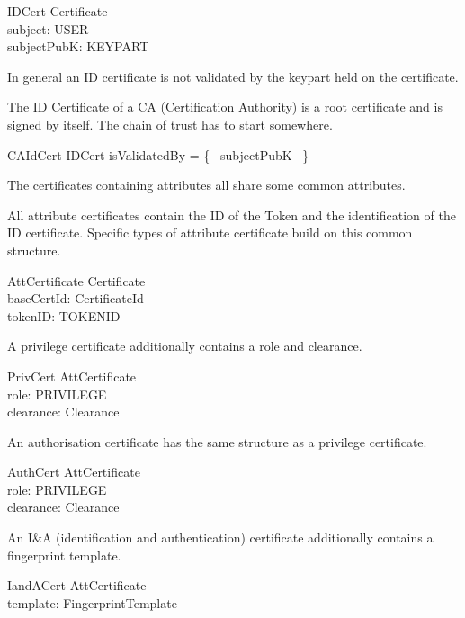 \begin{schema}{IDCert}
	Certificate
\\      subject: USER
\\      subjectPubK: KEYPART
\end{schema}

In general an ID certificate is not validated by the keypart held on
the certificate. 

The ID Certificate of a CA (Certification Authority) is a root
certificate and is signed by itself. The chain of trust has
to start somewhere.

\begin{schema}{CAIdCert}
        IDCert
\where
        isValidatedBy = \{~ subjectPubK ~\} 
\end{schema}


The certificates containing attributes all share some common
attributes. 

All attribute certificates contain the ID of 
the Token and the identification of the ID certificate. Specific types
of attribute certificate build on this common structure.
\begin{schema}{AttCertificate}
        Certificate
\\      baseCertId: CertificateId      
\\      tokenID: TOKENID 
\end{schema}


A privilege certificate additionally contains a role and clearance.
\begin{schema}{PrivCert}
	AttCertificate
\\	role: PRIVILEGE
\\	clearance: Clearance
\end{schema}


An authorisation certificate has the same structure as a privilege certificate.
\begin{schema}{AuthCert}
	AttCertificate
\\	role: PRIVILEGE
\\	clearance: Clearance
\end{schema}

An I\&A (identification and authentication) certificate additionally contains
a fingerprint template. 
\begin{schema}{IandACert}
	AttCertificate
\\	template: FingerprintTemplate
\end{schema}

